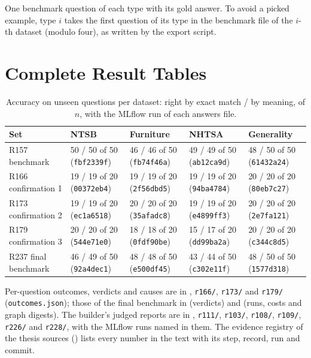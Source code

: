 One benchmark question of each type with its gold answer. To avoid a picked example, type $i$ takes the first
question of its type in the benchmark file of the $i$-th dataset (modulo four), as written by the export script.



\chapter{Complete Result Tables}\label{app:complete-result-tables}

\begin{table}[htbp]
\centering
\caption{Accuracy on unseen questions per dataset: right by exact match / by meaning, of $n$, with the MLflow run of each answers file.}
\label{tab:results-full}
\scriptsize
\setlength{\tabcolsep}{3pt}
\begin{tabular}{@{}lllll@{}}
\toprule
Set & NTSB & Furniture & NHTSA & Generality \\
\midrule
R157 benchmark & 50 / 50 of 50 (\texttt{fbf2339f}) & 46 / 46 of 50 (\texttt{fb74f46a}) & 49 / 49 of 50 (\texttt{ab12ca9d}) & 48 / 50 of 50 (\texttt{61432a24}) \\
R166 confirmation 1 & 19 / 19 of 20 (\texttt{00372eb4}) & 19 / 19 of 20 (\texttt{2f56dbd5}) & 19 / 19 of 20 (\texttt{94ba4784}) & 20 / 20 of 20 (\texttt{80eb7c27}) \\
R173 confirmation 2 & 19 / 19 of 20 (\texttt{ec1a6518}) & 20 / 20 of 20 (\texttt{35afadc8}) & 19 / 19 of 20 (\texttt{e4899ff3}) & 20 / 20 of 20 (\texttt{2e7fa121}) \\
R179 confirmation 3 & 20 / 20 of 20 (\texttt{544e71e0}) & 18 / 18 of 20 (\texttt{0fdf90be}) & 15 / 17 of 20 (\texttt{dd99ba2a}) & 20 / 20 of 20 (\texttt{c344c8d5}) \\
\midrule
R237 final benchmark & 46 / 49 of 50 (\texttt{92a4dec1}) & 48 / 48 of 50 (\texttt{e500df45}) & 43 / 44 of 50 (\texttt{c302e11f}) & 48 / 50 of 50 (\texttt{1577d318}) \\
\bottomrule
\end{tabular}
\end{table}

Per-question outcomes, verdicts and causes are in , \texttt{r166/}, \texttt{r173/} and
\texttt{r179/} (\texttt{outcomes.json}); those of the final benchmark in  (verdicts) and
 (runs, costs and graph digests). The builder's judged reports are in ,
\texttt{r111/}, \texttt{r103/}, \texttt{r108/}, \texttt{r109/}, \texttt{r226/} and \texttt{r228/}, with the MLflow
runs named in them. The evidence registry of the thesis sources () lists every
number in the text with its step, record, run and commit.

